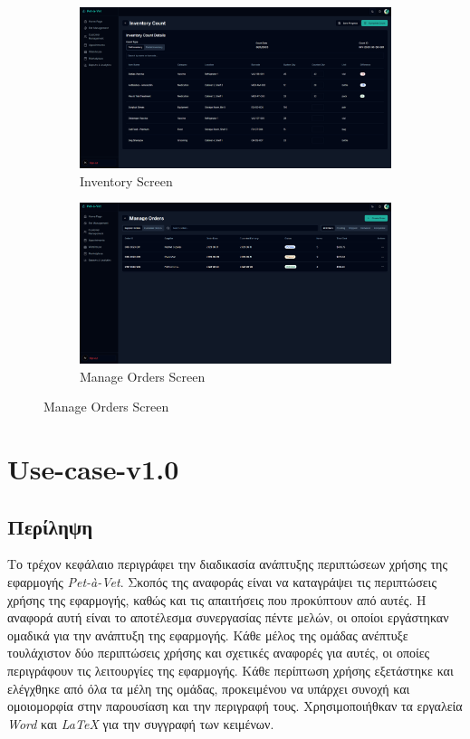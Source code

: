 \documentclass[12pt,a4paper,twoside]{book}
\begin{document}
\begin{figure}[H]
    \centering
    \begin{subfigure}[b]{0.48\textwidth}
        \centering
        \includegraphics[width=\textwidth]{Resources/Final UI/inventory.png}
        \caption{Inventory Screen}\label{fig:inventory-screen}
    \end{subfigure}
    \hfill
    \begin{subfigure}[b]{0.48\textwidth}
        \centering
        \includegraphics[width=\textwidth]{Resources/Final UI/manage-orders.png}
        \caption{Manage Orders Screen}\label{fig:manage-orders-screen}
    \end{subfigure}
\end{figure}

\chapter{Use-case-v1.0}

\section{Περίληψη}

Το τρέχον κεφάλαιο περιγράφει την διαδικασία ανάπτυξης περιπτώσεων χρήσης της εφαρμογής \textit{Pet-à-Vet}. Σκοπός της αναφοράς είναι να καταγράψει τις περιπτώσεις χρήσης της εφαρμογής, καθώς και τις απαιτήσεις που προκύπτουν από αυτές. Η αναφορά αυτή είναι το αποτέλεσμα συνεργασίας πέντε μελών, οι οποίοι εργάστηκαν ομαδικά για την ανάπτυξη της εφαρμογής. Κάθε μέλος της ομάδας ανέπτυξε τουλάχιστον δύο περιπτώσεις χρήσης και σχετικές αναφορές για αυτές, οι οποίες περιγράφουν τις λειτουργίες της εφαρμογής. Κάθε περίπτωση χρήσης εξετάστηκε και ελέγχθηκε από όλα τα μέλη της ομάδας, προκειμένου να υπάρχει συνοχή και ομοιομορφία στην παρουσίαση και την περιγραφή τους. Χρησιμοποιήθκαν τα εργαλεία \textit{Word} και \textit{LaTeX} για την συγγραφή των κειμένων. %
\end{document}
